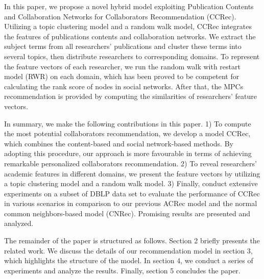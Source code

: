 \documentclass[review]{elsarticle}
\begin{document}
In this paper, we propose a novel hybrid model exploiting Publication Contents and Collaboration Networks for Collaborators Recommendation (CCRec). Utilizing a topic clustering model \cite{pan2010research} \cite{pham2011clustering} and a random walk model, CCRec integrates the features of publications contents and collaboration networks. We extract the subject terms from all researchers' publications and cluster these terms into several topics, then distribute researchers to corresponding domains. To represent the feature vectors of each researcher, we run the random walk with restart model (RWR) on each domain, which has been proved to be competent for calculating the rank score of nodes in social networks. After that, the MPCs recommendation is provided by computing the similarities of researchers' feature vectors.

In summary, we make the following contributions in this paper. 1) To compute the most potential collaborators recommendation, we develop a model CCRec, which combines the content-based and social network-based methods. By adopting this procedure, our approach is more favourable in terms of achieving remarkable personalized collaborators recommendation. 2) To reveal researchers' academic features in different domains, we present the feature vectors by utilizing a topic clustering model and a random walk model. 3) Finally, conduct extensive experiments on a subset of DBLP data set to evaluate the performance of CCRec in various scenarios in comparison to our previous ACRec model and the normal common neighbors-based model (CNRec). Promising results are presented and analyzed.

The remainder of the paper is structured as follows. Section 2 briefly presents the related work. We discuss the details of our recommendation model in section 3, which highlights the structure of the model. In section 4, we conduct a series of experiments and analyze the results. Finally, section 5 concludes the paper.

\end{document}
